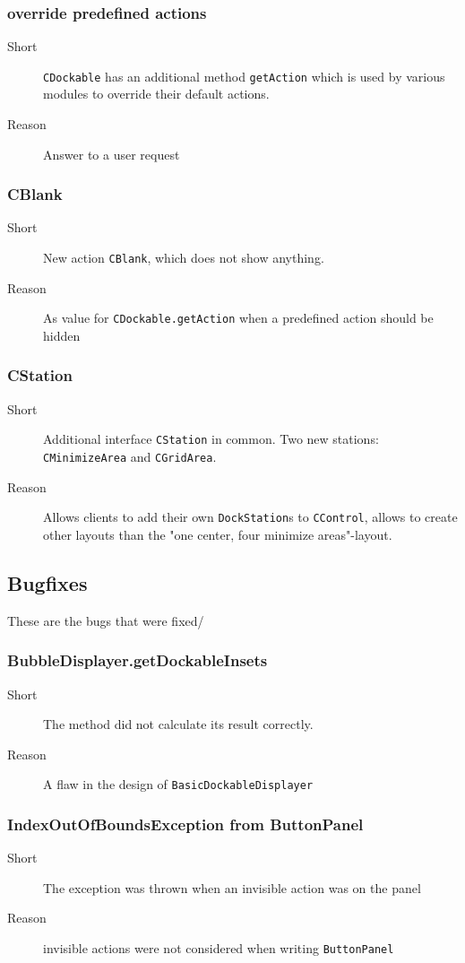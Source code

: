 \documentclass[a4paper,10pt]{article}
\newcommand{\src}[1]{\lstinline[basicstyle=\normalsize\ttfamily,keywordstyle=\normalsize\ttfamily,identifierstyle=\normalsize\ttfamily]|#1|}
\newcommand{\short}{\item[Short]}
\newcommand{\why}{\item[Reason]}
\begin{document}
\subsubsection{override predefined actions}
\begin{description}
 \short \src{CDockable} has an additional method \src{getAction} which is used by various modules to override their default actions.
 \why Answer to a user request
\end{description}

\subsubsection{CBlank}
\begin{description}
 \short New action \src{CBlank}, which does not show anything.
 \why As value for \src{CDockable.getAction} when a predefined action should be hidden
\end{description}

\subsubsection{CStation}
\begin{description}
 \short Additional interface \src{CStation} in common. Two new stations: \\\src{CMinimizeArea} and \src{CGridArea}.
 \why Allows clients to add their own \src{DockStation}s to \src{CControl}, allows to create other layouts than the
 "one center, four minimize areas"-layout.
\end{description}

\subsection{Bugfixes}
These are the bugs that were fixed/

\subsubsection{BubbleDisplayer.getDockableInsets}
\begin{description}
 \short The method did not calculate its result correctly.
 \why A flaw in the design of \src{BasicDockableDisplayer}
\end{description}

\subsubsection{IndexOutOfBoundsException from ButtonPanel}
\begin{description}
 \short The exception was thrown when an invisible action was on the panel
 \why invisible actions were not considered when writing \src{ButtonPanel}
\end{description}
\end{document}
